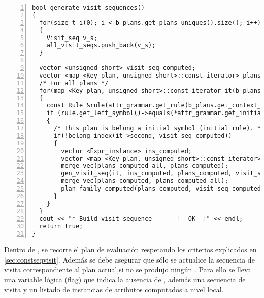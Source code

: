 \begin{lstlisting}[numbers=left, columns=fullflexible]
bool generate_visit_sequences()
{
  for(size_t i(0); i < b_plans.get_plans_uniques().size(); i++)
  {
    Visit_seq v_s;
    all_visit_seqs.push_back(v_s);
  }

  vector <unsigned short> visit_seq_computed;
  vector <map <Key_plan, unsigned short>::const_iterator> plans_computed_all;
  /* For all plans */
  for(map <Key_plan, unsigned short>::const_iterator it(b_plans.get_plans().begin()); it != b_plans.get_plans().end(); it++)
  {
    const Rule &rule(attr_grammar.get_rule(b_plans.get_context_unique(it->first.id_plan)[0]));
    if (rule.get_left_symbol()->equals(*attr_grammar.get_initial_symb()))
    {
      /* This plan is belong a initial symbol (initial rule). */
      if(!belong_index(it->second, visit_seq_computed))
      {
        vector <Expr_instance> ins_computed;
        vector <map <Key_plan, unsigned short>::const_iterator> plans_computed;
        merge_vec(plans_computed_all, plans_computed);
        gen_visit_seq(it, ins_computed, plans_computed, visit_seq_computed);
        merge_vec(plans_computed, plans_computed_all);
        plan_family_computed(plans_computed, visit_seq_computed);
      }
    }
  }
  cout << "* Build visit sequence ----- [  OK  ]" << endl;
  return true;
}
\end{lstlisting}

Dentro de , se recorre el plan de evaluación respetando los criterios explicados en \ref{sec:constseqvisit}. Además se debe asegurar que sólo se actualice la secuencia de visita correspondiente al plan actual,si no se produjo ningún . Para ello se lleva una variable lógica (flag) que indica la ausencia de , además una secuencia de visita y un listado de instancias de atributos computados a nivel local.

